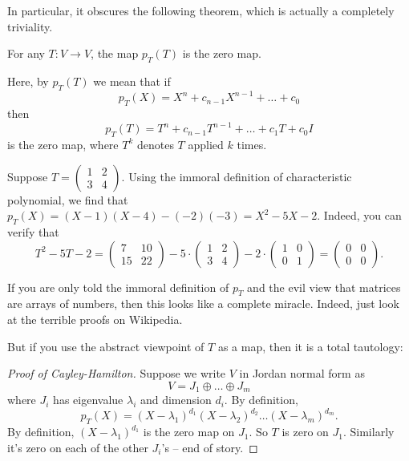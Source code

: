 In particular, it obscures the following theorem, which is actually a completely triviality.

\begin{theorem}
	For any $T : V \to V$,
	the map $p_T(T)$ is the zero map.
\end{theorem}
Here, by $p_T(T)$ we mean that if \[ p_T(X) = X^n + c_{n-1} X^{n-1} + \dots + c_0 \]
then \[ p_T(T) = T^n + c_{n-1} T^{n-1} + \dots + c_1 T +  c_0 I \] is the zero map,
where $T^k$ denotes $T$ applied $k$ times.

\begin{example}
	Suppose $T = \left(
	\begin{array}{cc}
		1 & 2 \\ 3 & 4
	\end{array}
	\right)$.
	Using the immoral definition of characteristic polynomial,
	we find that $p_T(X) = (X-1)(X-4)-(-2)(-3) = X^2 - 5X - 2$.
	Indeed, you can verify that
	\[ T^2 - 5T - 2
		=
		\left(
		\begin{array}{cc}
			7 & 10 \\
			15 & 22
		\end{array}
		\right)
		- 5 \cdot \left(
		\begin{array}{cc}
			1 & 2 \\
			3 & 4
		\end{array}
		\right)
		- 2 \cdot \left(
		\begin{array}{cc}
			1 & 0 \\
			0 & 1
		\end{array}
		\right)
		=
		\left(
		\begin{array}{cc}
			0 & 0 \\
			0 & 0
		\end{array}
		\right).
	\]
\end{example}
If you are only told the immoral definition of $p_T$ and the evil view that matrices are
arrays of numbers, then this looks like a complete miracle.
Indeed, just look at the terrible proofs on Wikipedia.

But if you use the abstract viewpoint of $T$ as a map, then it is a total tautology:
\begin{proof}[Proof of Cayley-Hamilton]
	Suppose we write $V$ in Jordan normal form as
	\[ V = J_1 \oplus \dots \oplus J_m \]
	where $J_i$ has eigenvalue $\lambda_i$ and dimension $d_i$.
	By definition,
	\[ p_T(X) = (X - \lambda_1)^{d_1} (X - \lambda_2)^{d_2} \dots (X - \lambda_m)^{d_m}. \]
	By definition, $(X - \lambda_1)^{d_1}$ is the zero map on $J_1$.
	So $T$ is zero on $J_1$.
	Similarly it's zero on each of the other $J_i$'s -- end of story.
\end{proof}

